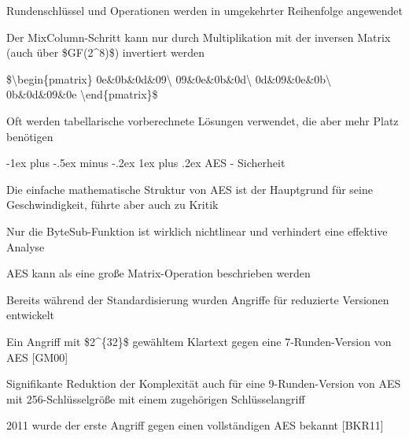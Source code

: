 \documentclass[a4paper]{article}
\makeatletter
\renewcommand{\subsubsection}{\@startsection{subsubsection}{3}{0mm}%
 {-1ex plus -.5ex minus -.2ex}%
 {1ex plus .2ex}%
 {\normalfont\small\bfseries}}
\makeatother
\begin{document}
\begin{multicols}{3}
\begin{itemize*}
            \begin{itemize*}
                  \item Rundenschlüssel und Operationen werden in umgekehrter Reihenfolge angewendet
                  \item Der MixColumn-Schritt kann nur durch Multiplikation mit der inversen Matrix (auch über \$GF(2\^{}8)\$) invertiert werden
                  \item \$\textbackslash begin\{pmatrix\} 0e\&0b\&0d\&09\textbackslash{} 09\&0e\&0b\&0d\textbackslash{} 0d\&09\&0e\&0b\textbackslash{} 0b\&0d\&09\&0e \textbackslash end\{pmatrix\}\$
                  \item Oft werden tabellarische vorberechnete Lösungen verwendet, die aber mehr Platz benötigen
            \end{itemize*}
      \end{itemize*}


      \subsubsection{AES - Sicherheit}

      \begin{itemize*}
            \item
            Die einfache mathematische Struktur von AES ist der Hauptgrund für
            seine Geschwindigkeit, führte aber auch zu Kritik
            \item
            Nur die ByteSub-Funktion ist wirklich nichtlinear und verhindert eine
            effektive Analyse
            \item
            AES kann als eine große Matrix-Operation beschrieben werden
            \item
            Bereits während der Standardisierung wurden Angriffe für reduzierte
            Versionen entwickelt

            \begin{itemize*}
                  \item Ein Angriff mit \$2\^{}\{32\}\$ gewähltem Klartext gegen eine 7-Runden-Version von AES {[}GM00{]}
                  \item Signifikante Reduktion der Komplexität auch für eine 9-Runden-Version von AES mit 256-Schlüsselgröße mit einem zugehörigen Schlüsselangriff
            \end{itemize*}
            \item
            2011 wurde der erste Angriff gegen einen vollständigen AES bekannt
            {[}BKR11{]}


\end{itemize*}
\end{multicols}
\end{document}
